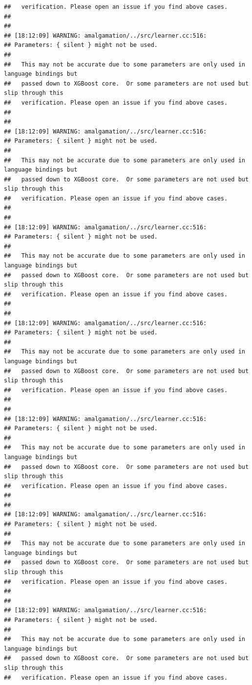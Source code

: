 \documentclass[AMS,STIX2COL]{WileyNJD-v2}\usepackage[]{graphicx}\usepackage[]{color}
\makeatletter
\newenvironment{kframe}{%
 \def\at@end@of@kframe{}%
 \ifinner\ifhmode%
  \def\at@end@of@kframe{\end{minipage}}%
  \begin{minipage}{\columnwidth}%
 \fi\fi%
 \def\FrameCommand##1{\hskip\@totalleftmargin \hskip-\fboxsep
 \colorbox{shadecolor}{##1}\hskip-\fboxsep
     \hskip-\linewidth \hskip-\@totalleftmargin \hskip\columnwidth}%
 \MakeFramed {\advance\hsize-\width
   \@totalleftmargin\z@ \linewidth\hsize
   \@setminipage}}%
 {\par\unskip\endMakeFramed%
 \at@end@of@kframe}
\newenvironment{knitrout}{}{} %
\makeatother
\begin{document}
\begin{knitrout}
\begin{kframe}
\begin{verbatim}
##   verification. Please open an issue if you find above cases.
## 
## 
## [18:12:09] WARNING: amalgamation/../src/learner.cc:516: 
## Parameters: { silent } might not be used.
## 
##   This may not be accurate due to some parameters are only used in language bindings but
##   passed down to XGBoost core.  Or some parameters are not used but slip through this
##   verification. Please open an issue if you find above cases.
## 
## 
## [18:12:09] WARNING: amalgamation/../src/learner.cc:516: 
## Parameters: { silent } might not be used.
## 
##   This may not be accurate due to some parameters are only used in language bindings but
##   passed down to XGBoost core.  Or some parameters are not used but slip through this
##   verification. Please open an issue if you find above cases.
## 
## 
## [18:12:09] WARNING: amalgamation/../src/learner.cc:516: 
## Parameters: { silent } might not be used.
## 
##   This may not be accurate due to some parameters are only used in language bindings but
##   passed down to XGBoost core.  Or some parameters are not used but slip through this
##   verification. Please open an issue if you find above cases.
## 
## 
## [18:12:09] WARNING: amalgamation/../src/learner.cc:516: 
## Parameters: { silent } might not be used.
## 
##   This may not be accurate due to some parameters are only used in language bindings but
##   passed down to XGBoost core.  Or some parameters are not used but slip through this
##   verification. Please open an issue if you find above cases.
## 
## 
## [18:12:09] WARNING: amalgamation/../src/learner.cc:516: 
## Parameters: { silent } might not be used.
## 
##   This may not be accurate due to some parameters are only used in language bindings but
##   passed down to XGBoost core.  Or some parameters are not used but slip through this
##   verification. Please open an issue if you find above cases.
## 
## 
## [18:12:09] WARNING: amalgamation/../src/learner.cc:516: 
## Parameters: { silent } might not be used.
## 
##   This may not be accurate due to some parameters are only used in language bindings but
##   passed down to XGBoost core.  Or some parameters are not used but slip through this
##   verification. Please open an issue if you find above cases.
## 
## 
## [18:12:09] WARNING: amalgamation/../src/learner.cc:516: 
## Parameters: { silent } might not be used.
## 
##   This may not be accurate due to some parameters are only used in language bindings but
##   passed down to XGBoost core.  Or some parameters are not used but slip through this
##   verification. Please open an issue if you find above cases.

\end{verbatim}
\end{kframe}
\end{knitrout}
\end{document}
